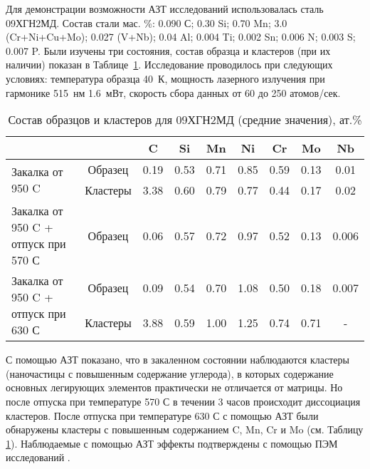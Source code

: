 Для демонстрации возможности АЗТ исследований использовалась сталь 09ХГН2МД. Состав стали мас. \%: 0.090 С; 0.30 Si; 0.70 Mn; 3.0 (Cr+Ni+Cu+Mo); 0.027 (V+Nb); 0.04 Al; 0.004 Ti; 0.002 Sn; 0.006 N; 0.003 S; 0.007 P. Были изучены три состояния,  состав образца и кластеров (при их наличии) показан в Таблице~\cref{tab:SteelComposition09X}. Исследование проводилось при следующих условиях: температура образца 40~К, мощность лазерного излучения при гармонике 515~нм 1.6~мВт, скорость сбора данных от 60 до 250 атомов/сек.


\begin{table} [htbp]
	\centering
	\caption{Состав образцов и кластеров для 09ХГН2МД (средние значения), ат.\%}
	\label{tab:SteelComposition09X}%
	\begin{SingleSpace}
		\begin{tabular}{| p{4.5cm} | c | c | c | c | c | c | c | c |}
			\hline
			 & & C & Si & Mn & Ni & Cr & Mo & Nb     \\ \hline
			\multirow{2}{*}{Закалка от 950 \textdegree C} & Образец & 0.19 & 0.53 & 0.71 & 0.85 & 0.59 & 0.13 & 0.01    \\ \cline{2-9}
			& Кластеры & 3.38 & 0.60 & 0.79 & 0.77 & 0.44 & 0.17 & 0.02    \\  \hline		
			Закалка от 950 \textdegree C + отпуск при 570 \textdegree С & Образец & 0.06 & 0.57 & 0.72 & 0.97 & 0.52 & 0.13 & 0.006    \\ \hline
			\multirow{2}{45mm}{Закалка от 950 \textdegree C + отпуск при 630 \textdegree С} & Образец & 0.09 & 0.54 & 0.70 & 1.08 & 0.50 & 0.18 & 0.007    \\ \cline{2-9}
			& Кластеры & 3.88 & 0.59 & 1.00 & 1.25 & 0.74 & 0.71 & -    \\  \hline	
		\end{tabular}%
	\end{SingleSpace}
\end{table}

\FloatBarrier
С помощью АЗТ показано, что в закаленном состоянии наблюдаются кластеры (наночастицы с повышенным содержание углерода), в которых содержание основных легирующих элементов практически не отличается от матрицы. Но после отпуска при температуре 570 \textdegree С в течении 3 часов происходит диссоциация кластеров. После отпуска при температуре 630 \textdegree С с помощью АЗТ были обнаружены кластеры с повышенным содержанием C, Mn, Cr и Mo (см. Таблицу \cref{tab:SteelComposition09X}). Наблюдаемые с помощью АЗТ эффекты подтверждены с помощью ПЭМ исследований \cite{scbibGlubev}.

